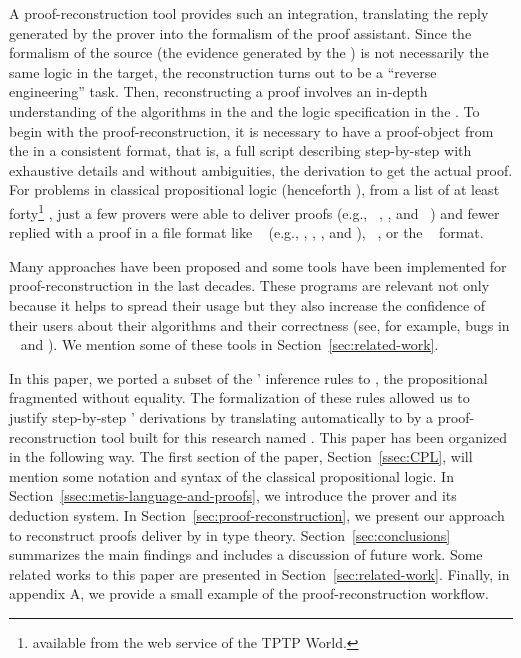 \documentclass[../main.tex]{subfiles}
\begin{document}
A proof-reconstruction tool provides such an integration, translating
the reply generated by the prover into the formalism of the proof
assistant. Since the formalism of the source (the evidence
generated by the \ATP) is not necessarily the same logic in the
target, the reconstruction turns out to be a ``reverse engineering''
task. Then, reconstructing a proof involves an in-depth
understanding of the algorithms in the \ATP and the logic specification
in the \ITP. To begin with the proof-reconstruction, it is
necessary to have a proof-object from the \ATP in a consistent
format, that is, a full script describing step-by-step
with exhaustive details and without ambiguities, the derivation to
get the actual proof.
For problems in classical propositional logic (henceforth \CPL),
from a list of at least forty\footnote{\ATPs available from the web
service  of the TPTP World.} \ATPs, just a few
provers were able to deliver proofs (e.g.,
~\cite{Barrett2011}, , and
~\cite{hillenbrand1997}) and fewer replied with
a proof
in a file format like \TSTP~\cite{Sutcliffe-Schulz-Claessen-VanGelder-2006}
(e.g., , \Metis, , and ),
~\cite{Stump2008}, or the ~\cite{Bohme2011} format.

Many approaches have been proposed and some tools have been
implemented for proof-reconstruction in the last decades. These
programs are relevant not only because it helps to spread their
usage but they also increase the confidence of their users about
their algorithms and their correctness (see, for example, bugs in
\ATPs~\cite{Keller2013,Bohme2011,Fleury2014} and
\cite{Kanso2012}).
We mention some of these tools in Section~\ref{sec:related-work}.

In this paper, we ported a subset of the \Metis' inference rules to
\Agda, the propositional fragmented without equality. The formalization of
these rules allowed us to justify step-by-step \Metis' \TSTP derivations by
translating automatically to \Agda by a proof-reconstruction tool built for
this research named \Athena.
This paper has been organized in the following way.
The first section of the paper, Section~\ref{ssec:CPL}, will mention some
notation and syntax of the classical propositional logic.
In Section~\ref{ssec:metis-language-and-proofs}, we introduce the
\Metis prover and its deduction system.
In Section~\ref{sec:proof-reconstruction}, we present our
approach to reconstruct proofs deliver by \Metis in type theory.
Section~\ref{sec:conclusions} summarizes the main findings and includes a
discussion of future work.
Some related works to this paper are presented in Section~\ref{sec:related-work}.
Finally, in appendix \textsc{A}, we provide a small example of the
proof-reconstruction workflow.
\end{document}
